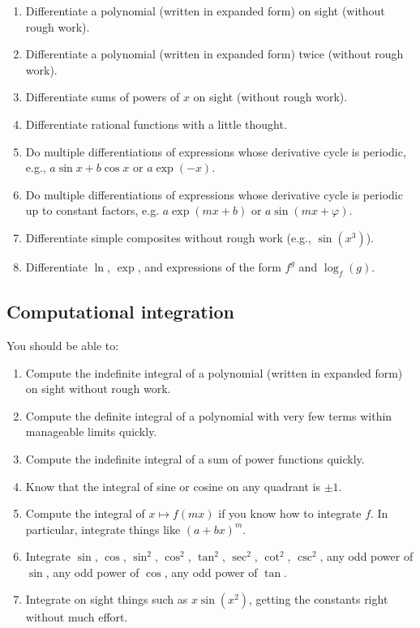 \documentclass[10pt]{amsart}
\begin{document}
\begin{enumerate}
\item Differentiate a polynomial (written in expanded form) on sight
  (without rough work).
\item Differentiate a polynomial (written in expanded form) twice
  (without rough work).
\item Differentiate sums of powers of $x$ on sight (without rough
  work).
\item Differentiate rational functions with a little thought.
\item Do multiple differentiations of expressions whose derivative
  cycle is periodic, e.g., $a \sin x + b \cos x$ or $a \exp(-x)$.
\item Do multiple differentiations of expressions whose derivative
  cycle is periodic up to constant factors, e.g. $a \exp(mx + b)$ or $a
  \sin(mx + \varphi)$.
\item Differentiate simple composites without rough work (e.g.,
  $\sin(x^3)$).
\item Differentiate $\ln$, $\exp$, and expressions of the form $f^g$
  and $\log_f(g)$.
\end{enumerate}

\subsection{Computational integration}

You should be able to:

\begin{enumerate}
\item Compute the indefinite integral of a polynomial (written in
  expanded form) on sight without rough work.
\item Compute the definite integral of a polynomial with very few
  terms within manageable limits quickly.
\item Compute the indefinite integral of a sum of power functions
  quickly.
\item Know that the integral of sine or cosine on any quadrant is $\pm
  1$.
\item Compute the integral of $x \mapsto f(mx)$ if you know how to
  integrate $f$. In particular, integrate things like $(a + bx)^m$.
\item Integrate $\sin$, $\cos$, $\sin^2$, $\cos^2$, $\tan^2$,
  $\sec^2$, $\cot^2$, $\csc^2$, any odd power of $\sin$, any odd power
  of $\cos$, any odd power of $\tan$.
\item Integrate on sight things such as $x\sin(x^2)$, getting the
  constants right without much effort.
\end{enumerate}
\end{document}
